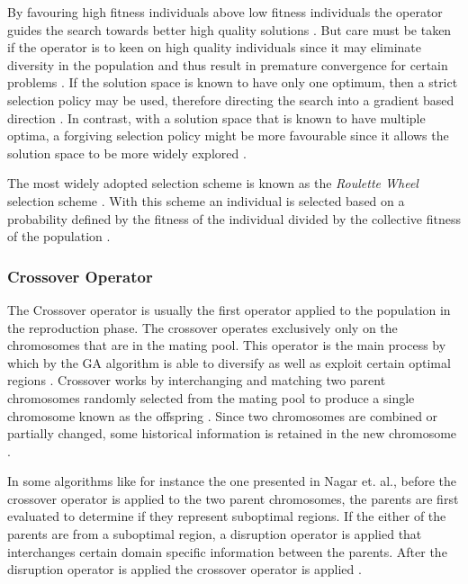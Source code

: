 By favouring high fitness individuals above low fitness individuals the operator guides the search towards better high quality solutions \cite{ConstrainedGA}. But care must be taken if the operator is to keen on high quality individuals since it may eliminate diversity in the population and thus result in premature convergence for certain problems \cite{ConstrainedGA}. If the solution space is known to have only one optimum, then a strict selection policy may be used, therefore directing the search into a gradient based direction \cite{ConstrainedGA}. In contrast, with a solution space that is known to have multiple optima, a forgiving selection policy might be more favourable since it allows the solution space to be more widely explored \cite{ConstrainedGA}.

The most widely adopted selection scheme is known as the \emph{Roulette Wheel} selection scheme \cite{ConstrainedGA,GeostatisticalGA,HybridBaldwinGA,CoactiveFuzzyGA}. With this scheme an individual is selected based on a probability defined by the fitness of the individual divided by the collective fitness of the population \cite{GeostatisticalGA}.
\subsubsection{Crossover Operator}
The Crossover operator is usually the first operator applied to the population in the reproduction phase. The crossover operates exclusively only on the chromosomes that are in the mating pool. This operator is the main process by which by the GA algorithm is able to diversify as well as exploit certain optimal regions \cite{CombinedBranchBoundGA,CoactiveFuzzyGA}. Crossover works by interchanging and matching two parent chromosomes randomly selected from the mating pool to produce a single chromosome known as the offspring \cite{FamilyGA,HumanPassiveGA,CoactiveFuzzyGA}. Since two chromosomes are combined or partially changed, some historical information is retained in the new chromosome \cite{FamilyGA}.

In some algorithms like for instance the one presented in Nagar et. al., before the crossover operator is applied to the two parent chromosomes, the parents are first evaluated to determine if they represent suboptimal regions. If the either of the parents are from a suboptimal region, a disruption operator is applied that interchanges certain domain specific information between the parents. After the disruption operator is applied the crossover operator is applied \cite{CombinedBranchBoundGA}.

